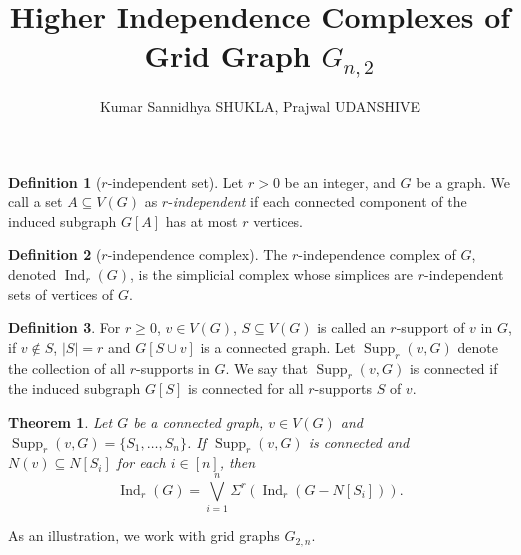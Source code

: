 \documentclass{amsart}
\title{Higher Independence Complexes of Grid Graph $G_{n,2}$}
\author{Kumar Sannidhya SHUKLA, Prajwal UDANSHIVE}
\newtheorem{theorem}{Theorem}[section]
\theoremstyle{theorem}
\theoremstyle{proposition}
\theoremstyle{remark}
\theoremstyle{definition}
\newtheorem{definition}{Definition}[section]
\theoremstyle{remark}
\theoremstyle{remark}
\begin{document}
\maketitle

\begin{definition}[$r$-independent set]
Let $r>0$ be an integer, and $G$ be a graph. We call a set $A\subseteq V(G)$ as $r$-\emph{independent} if each connected component of the induced subgraph $G[A]$ has at most $r$ vertices. 
\end{definition}
\begin{definition}[$r$-independence complex]
The $r$-independence complex of $G$, denoted $\operatorname{Ind}_r(G)$, is the simplicial complex whose simplices are $r$-independent sets of vertices of $G$.
\end{definition}
\begin{definition}
For $r\geq 0$, $v\in V(G)$, $S\subseteq V(G)$ is called an $r$-support of $v$ in $G$, if $v\not\in S$, $|S|=r$ and $G[S\cup v]$ is a connected graph. Let $\operatorname{Supp}_{r}(v,G)$ denote the collection of all $r$-supports in $G$. We say that $\operatorname{Supp}_r(v,G)$ is connected if the induced subgraph $G[S]$ is connected for all $r$-supports $S$ of $v$.
\end{definition}
\begin{theorem}
Let $G$ be a connected graph, $v\in V(G)$ and $\operatorname{Supp}_r(v,G) = \{S_1,\dots,S_n\}$. If $\operatorname{Supp}_r(v,G)$ is connected and $N(v)\subseteq N[S_i]$ for each $i\in[n]$, then
\begin{equation*}
\operatorname{Ind}_r(G) = \bigvee\limits_{i=1}^{n}\Sigma^r(\operatorname{Ind}_r(G-N[S_i])).
\end{equation*}
\end{theorem}
As an illustration, we work with grid graphs $G_{2,n}$.
\end{document}
